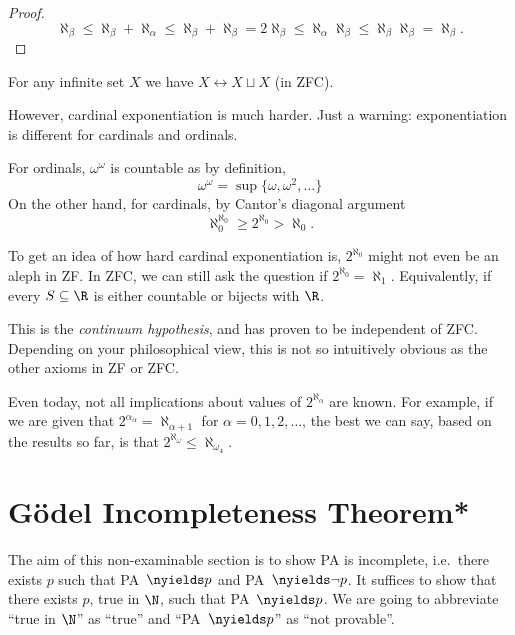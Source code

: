 \documentclass[a4paper]{article}
\newcommand*{\biject}{\leftrightarrow}
\begin{document}
\begin{proof}
  \[
    \aleph_\beta \leq \aleph_\beta + \aleph_\alpha \leq \aleph_\beta + \aleph_\beta = 2\aleph_\beta \leq \aleph_\alpha \aleph_\beta \leq \aleph_\beta \aleph_\beta = \aleph_\beta.
  \]
\end{proof}

\begin{eg}
  For any infinite set \(X\) we have \(X \biject X \sqcup X\) (in ZFC).
\end{eg}

However, cardinal exponentiation is much harder. Just a warning: exponentiation is different for cardinals and ordinals.

\begin{eg}
  For ordinals, \(\omega^\omega\) is countable as by definition,
  \[
    \omega^\omega = \sup\{\omega, \omega^2, \dots \}
  \]
  On the other hand, for cardinals, by Cantor's diagonal argument
  \[
    \aleph_0^{\aleph_0} \geq 2^{\aleph_0} > \aleph_0.
  \]
\end{eg}

To get an idea of how hard cardinal exponentiation is, \(2^{\aleph_0}\) might not even be an aleph in ZF. In ZFC, we can still ask the question if \(2^{\aleph_0} = \aleph_1\). Equivalently, if every \(S \subseteq \R\) is either countable or bijects with \(\R\).

This is the \emph{continuum hypothesis}, and has proven to be independent of ZFC. Depending on your philosophical view, this is not so intuitively obvious as the other axioms in ZF or ZFC.

Even today, not all implications about values of \(2^{\aleph_\alpha}\) are known. For example, if we are given that \(2^{\alpha_\alpha} = \aleph_{\alpha + 1}\) for \(\alpha = 0, 1, 2, \dots\), the best we can say, based on the results so far, is that \(2^{\aleph_\omega} \leq \aleph_{\omega_4}\).

\section{Gödel Incompleteness Theorem*}

The aim of this non-examinable section is to show PA is incomplete, i.e.\ there exists \(p\) such that PA~\(\nyields p\) and PA~\(\nyields \neg p\). It suffices to show that there exists \(p\), true in \(\N\), such that PA~\(\nyields p\). We are going to abbreviate ``true in \(\N\)'' as ``true'' and ``PA~\(\nyields p\)'' as ``not provable''.
\end{document}
